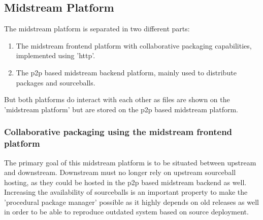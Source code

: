 \documentclass[a4paper,10pt]{article}
\begin{document}
\subsection{Midstream Platform} 
\label{MidstreamPlatform}
The midstream platform is separated in two different parts:
\begin{enumerate}
\item The midstream frontend platform with collaborative packaging capabilities, implemented using 'http'.
\item The p2p based midstream backend platform, mainly used to distribute packages and sourceballs.
\end{enumerate}

But both platforms do interact with each other as files are shown on the 'midstream platform' but are stored on the p2p based midstream platform.

\subsubsection{Collaborative packaging using the midstream frontend platform} 
The primary goal of this midstream platform is to be situated between upstream and downstream. Downstream must no longer rely on upstream sourceball hosting, as they could be hosted in the p2p based midstream backend as well. Increasing the availability of sourceballs is an important property to make the 'procedural package manager' possible as it highly depends on old releases as well in order to be able to reproduce outdated system based on source deployment.
\end{document}
